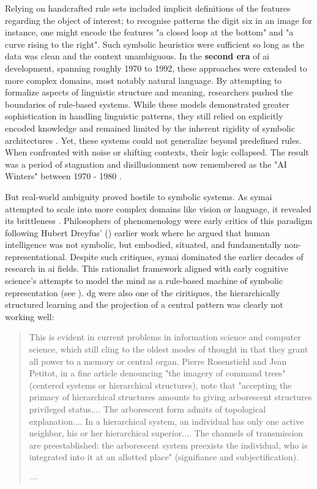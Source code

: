 \greensquare
Relying on handcrafted rule sets included implicit definitions of the features regarding the object of interest; to recognise patterns the digit six in an image for instance, one might encode the features "a closed loop at the bottom" and "a curve rising to the right". Such symbolic heuristics were sufficient so long as the data was clean and the context unambiguous. In the \textbf{second era} of \gls{ai} development, spanning roughly 1970 to 1992, these approaches were extended to more complex domains, most notably natural language. By attempting to formalize aspects of linguistic structure and meaning, researchers pushed the boundaries of rule-based systems. While these models demonstrated greater sophistication in handling linguistic patterns, they still relied on explicitly encoded knowledge and remained limited by the inherent rigidity of symbolic architectures \parencite[129]{manning2022a}. Yet, these systems could not generalize beyond predefined rules. When confronted with noise or shifting contexts, their logic collapsed. The result was a period of stagnation and disillusionment now remembered as the "AI Winters" between 1970 - 1980 \parencite[183]{eloff2021}.


\greensquare
But real-world ambiguity proved hostile to symbolic systems. As \gls{symai} attempted to scale into more complex domains like vision or language, it revealed its brittleness \parencite[183--184]{eloff2021}. Philosophers of phenomenology were early critics of this paradigm following Hubert Dreyfus' (\cite*{dreyfus2009}) earlier work where he argued that human intelligence was not symbolic, but embodied, situated, and fundamentally non-representational. Despite such critiques, \gls{symai} dominated the earlier decades of research in \gls{ai} fields. This rationalist framework aligned with early cognitive science’s attempts to model the mind as a rule-based machine of symbolic representation (see \cite[194--197]{montanari2025}). \gls{dg} were also one of the ciritiques, the hierarchically structured learning and the projection of a central pattern was clearly not working well:

\begin{quote}
	This is evident in current problems in information science and computer science, which still cling to the oldest modes of thought in that they grant all power to a memory or central organ. Pierre Rosenstiehl and Jean Petitot, in a fine article denouncing "the imagery of command trees" (centered systems or hierarchical structures), note that "accepting the primacy of hierarchical structures amounts to giving arborescent structures privileged status.... The arborescent form admits of topological explanation.... In a hierarchical system, an individual has only one active neighbor, his or her hierarchical superior.... The channels of transmission are preestablished: the arborescent system preexists the individual, who is integrated into it at an allotted place" (signifiance and subjectification).

	— \cite[16]{deleuze1987}
\end{quote}

